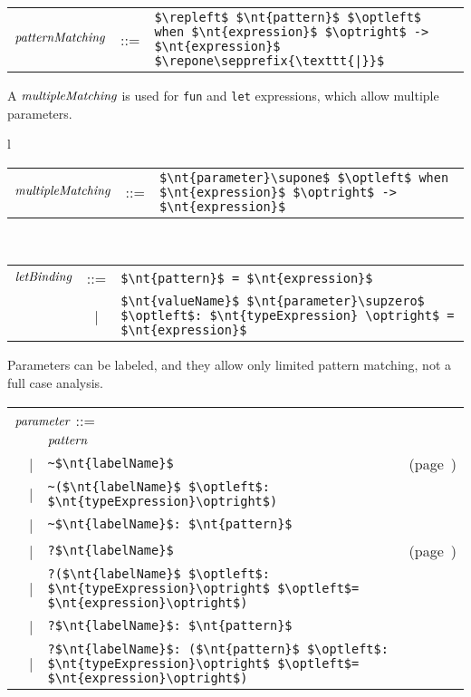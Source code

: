 \begin{center}
\begin{tabular}{rcl}
$\textit{\rmfamily patternMatching}$ & ::= & \hbox{\lstinline/$\repleft$ $\nt{pattern}$ $\optleft$ when $\nt{expression}$ $\optright$ -> $\nt{expression}$ $\repone\sepprefix{\texttt{|}}$/}
\end{tabular}
\end{center}
%
A $\textit{\rmfamily multipleMatching}$ is used for \hbox{\lstinline/fun/} and \hbox{\lstinline/let/} expressions, which allow
multiple parameters. 

\begin{center}
\begin{tabular}{l}
\begin{tabular}{rcl}
$\textit{\rmfamily multipleMatching}$ & ::= & \hbox{\lstinline/$\nt{parameter}\supone$ $\optleft$ when $\nt{expression}$ $\optright$ -> $\nt{expression}$/}
\end{tabular}
\\
\begin{tabular}{rcl}
$\textit{\rmfamily letBinding}$ & ::= & \hbox{\lstinline/$\nt{pattern}$ = $\nt{expression}$/}\\
& | & \hbox{\lstinline/$\nt{valueName}$ $\nt{parameter}\supzero$ $\optleft$: $\nt{typeExpression} \optright$ = $\nt{expression}$/}
\end{tabular}
\end{tabular}
\end{center}
%
Parameters can be labeled, and they allow only limited pattern matching, not a full case analysis.

\begin{center}
\begin{tabular}{rcll}
\multicolumn{4}{l}{$\textit{\rmfamily parameter}$ ::=}\\
&   & $\textit{\rmfamily pattern}$\\
& | & \hbox{\lstinline/~$\nt{labelName}$/} & (page~\pageref{literal:label})\\
& | & \hbox{\lstinline/~($\nt{labelName}$ $\optleft$: $\nt{typeExpression}\optright$)/}\\
& | & \hbox{\lstinline/~$\nt{labelName}$: $\nt{pattern}$/}\\
& | & \hbox{\lstinline/?$\nt{labelName}$/} & (page~\pageref{literal:label})\\
& | & \hbox{\lstinline/?($\nt{labelName}$ $\optleft$: $\nt{typeExpression}\optright$ $\optleft$= $\nt{expression}\optright$)/}\\
& | & \hbox{\lstinline/?$\nt{labelName}$: $\nt{pattern}$/}\\
& | & \hbox{\lstinline/?$\nt{labelName}$: ($\nt{pattern}$ $\optleft$: $\nt{typeExpression}\optright$ $\optleft$= $\nt{expression}\optright$)/}
\end{tabular}
\end{center}


